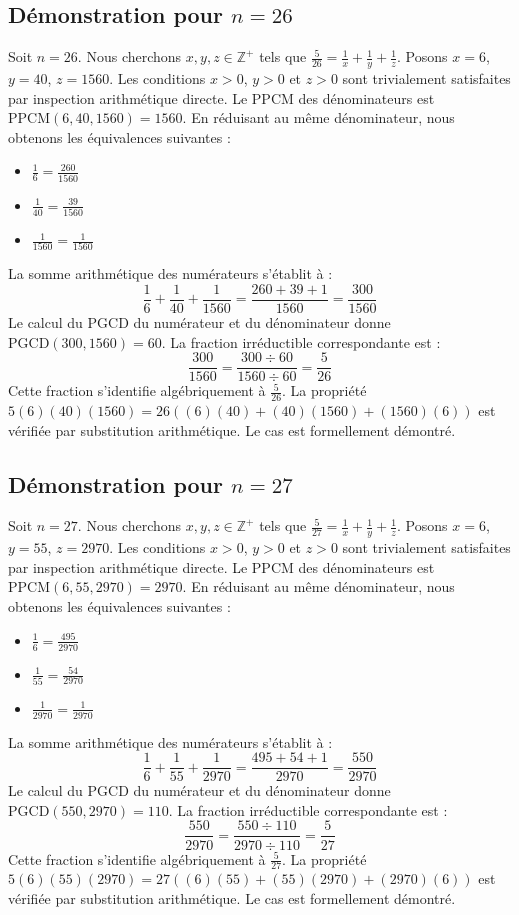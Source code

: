 \documentclass[12pt,a4paper]{article}
\begin{document}
\subsection{Démonstration pour $n = 26$}
Soit $n = 26$. Nous cherchons $x, y, z \in \mathbb{Z}^{+}$ tels que $\frac{5}{26} = \frac{1}{x} + \frac{1}{y} + \frac{1}{z}$.
Posons $x = 6$, $y = 40$, $z = 1560$.
Les conditions $x > 0$, $y > 0$ et $z > 0$ sont trivialement satisfaites par inspection arithmétique directe.
Le PPCM des dénominateurs est $\text{PPCM}(6, 40, 1560) = 1560$.
En réduisant au même dénominateur, nous obtenons les équivalences suivantes :
\begin{itemize}
    \item $\frac{1}{6} = \frac{260}{1560}$
    \item $\frac{1}{40} = \frac{39}{1560}$
    \item $\frac{1}{1560} = \frac{1}{1560}$
\end{itemize}
La somme arithmétique des numérateurs s'établit à :
$$ \frac{1}{6} + \frac{1}{40} + \frac{1}{1560} = \frac{260 + 39 + 1}{1560} = \frac{300}{1560} $$
Le calcul du PGCD du numérateur et du dénominateur donne $\text{PGCD}(300, 1560) = 60$.
La fraction irréductible correspondante est :
$$ \frac{300}{1560} = \frac{300 \div 60}{1560 \div 60} = \frac{5}{26} $$
Cette fraction s'identifie algébriquement à $\frac{5}{26}$.
La propriété $5(6)(40)(1560) = 26((6)(40) + (40)(1560) + (1560)(6))$ est vérifiée par substitution arithmétique.
Le cas est formellement démontré.

\subsection{Démonstration pour $n = 27$}
Soit $n = 27$. Nous cherchons $x, y, z \in \mathbb{Z}^{+}$ tels que $\frac{5}{27} = \frac{1}{x} + \frac{1}{y} + \frac{1}{z}$.
Posons $x = 6$, $y = 55$, $z = 2970$.
Les conditions $x > 0$, $y > 0$ et $z > 0$ sont trivialement satisfaites par inspection arithmétique directe.
Le PPCM des dénominateurs est $\text{PPCM}(6, 55, 2970) = 2970$.
En réduisant au même dénominateur, nous obtenons les équivalences suivantes :
\begin{itemize}
    \item $\frac{1}{6} = \frac{495}{2970}$
    \item $\frac{1}{55} = \frac{54}{2970}$
    \item $\frac{1}{2970} = \frac{1}{2970}$
\end{itemize}
La somme arithmétique des numérateurs s'établit à :
$$ \frac{1}{6} + \frac{1}{55} + \frac{1}{2970} = \frac{495 + 54 + 1}{2970} = \frac{550}{2970} $$
Le calcul du PGCD du numérateur et du dénominateur donne $\text{PGCD}(550, 2970) = 110$.
La fraction irréductible correspondante est :
$$ \frac{550}{2970} = \frac{550 \div 110}{2970 \div 110} = \frac{5}{27} $$
Cette fraction s'identifie algébriquement à $\frac{5}{27}$.
La propriété $5(6)(55)(2970) = 27((6)(55) + (55)(2970) + (2970)(6))$ est vérifiée par substitution arithmétique.
Le cas est formellement démontré.
\end{document}
